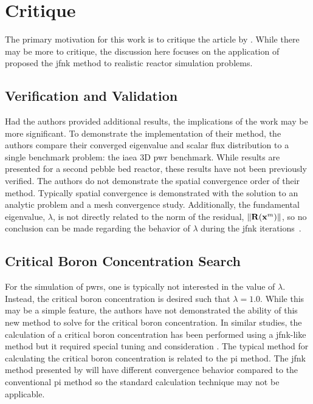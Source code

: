 \section{Critique}
\label{sec:critique}

  The primary motivation for this work is to critique the article by
  \citeauthor{qe2paper}. While there may be more to critique, the discussion
  here focuses on the application of proposed the \gls{jfnk} method to realistic
  reactor simulation problems.

  \subsection{Verification and Validation}

    Had the authors provided additional results, the implications of the work
    may be more significant. To demonstrate the implementation of their method,
    the authors compare their converged eigenvalue and scalar flux distribution
    to a single benchmark problem: the \gls{iaea} 3D \gls{pwr} benchmark. While
    results are presented for a second pebble bed reactor, these results have
    not been previously verified. The authors do not demonstrate the spatial
    convergence order of their method. Typically spatial convergence is
    demonstrated with the solution to an analytic problem and a mesh convergence
    study. Additionally, the fundamental eigenvalue, $\lambda$, is not directly
    related to the norm of the residual, $\| \mathbf{R} (\mathbf{x}^m) \|$, so no
    conclusion can be made regarding the behavior of $\lambda$ during the
    \gls{jfnk} iterations~\cite{caslJFNK}.

  \subsection{Critical Boron Concentration Search}

    For the simulation of \glspl{pwr}, one is typically not interested in the
    value of $\lambda$. Instead, the critical boron concentration is desired
    such that $\lambda=1.0$. While this may be a simple feature, the authors
    have not demonstrated the ability of this new method to solve for the
    critical boron concentration. In similar studies, the calculation of a
    critical boron concentration has been performed using a \gls{jfnk}-like
    method but it required special tuning and consideration \cite{caslJFNK}. The
    typical method for calculating the critical boron concentration is related
    to the \gls{pi} method. The \gls{jfnk} method presented by
    \citeauthor{qe2paper} will have different convergence behavior compared to
    the conventional \gls{pi} method so the standard calculation technique may
    not be applicable.

